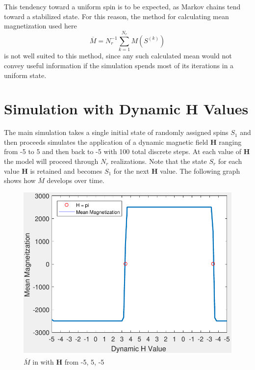\documentclass{article}
\begin{document}
\noindent This tendency toward a uniform spin is to be expected, as Markov chains tend toward a stabilized state. For this reason, the method for calculating mean magnetization used here
\begin{equation}
\overline{M} = N_r^{-1} \sum_{k=1}^{N_r} M(S^{(k)})
\end{equation}
is not well suited to this method, since any such calculated mean would not convey useful information if the simulation spends most of its iterations in a uniform state.

\section{Simulation with Dynamic $\textbf{H}$ Values}

\noindent The main simulation takes a single initial state of randomly assigned spins $S_1$ and then proceeds simulates the application of a dynamic magnetic field $\textbf{H}$ ranging from -5 to 5 and then back to -5 with 100 total discrete steps. At each value of $\textbf{H}$ the model will proceed through $N_r$ realizations. Note that the state $S_r$ for each value $\textbf{H}$ is retained and becomes $S_1$ for the next $\textbf{H}$ value. The following graph shows how $\overline{M}$ develops over time.
\begin{figure}[H]
\centering
    \includegraphics[width=\textwidth]{dynamicHtime.pdf}
	\caption{$\overline{M}$ in with $\textbf{H}$ from -5, 5, -5}
\end{figure}
\end{document}
